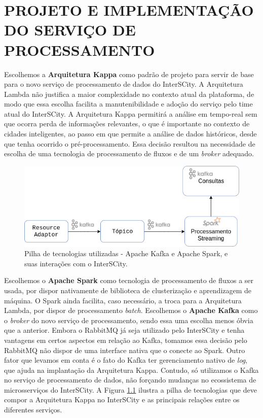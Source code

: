 \chapter[PROJETO E IMPLEMENTAÇÃO DO SERVIÇO DE PROCESSAMENTO]{PROJETO E IMPLEMENTAÇÃO DO SERVIÇO DE PROCESSAMENTO}

\label{chapter:architecture}

Escolhemos a \textbf{Arquitetura Kappa} como padrão de projeto para servir
de base para o novo serviço de processamento de dados do InterSCity.
A Arquitetura Lambda não justifica a maior complexidade no contexto atual da
plataforma, de modo que essa escolha facilita a manutenibilidade e adoção do
serviço pelo time atual do InterSCity. A Arquitetura Kappa permitirá a análise
em tempo-real sem que ocorra perda de informações relevantes, o que é
importante no contexto de cidades inteligentes, ao passo em que permite a
análise de dados históricos, desde que tenha ocorrido o pré-processamento.
Essa decisão resultou na necessidade de escolha de uma tecnologia de
processamento de fluxos e de um \textit{broker} adequado.

\begin{figure}[hbt]
  \centering
    \includegraphics[scale=0.5]{figuras/kappa_tools2.png}
  \caption{Pilha de tecnologias utilizadas - Apache Kafka e Apache Spark, e suas
    interações com o InterSCity.}
  \label{fig:stack}
\end{figure}

Escolhemos o \textbf{Apache Spark} como tecnologia de processamento de fluxos
a ser usada, por dispor nativamente de biblioteca de clusterização
e aprendizagem de máquina. O Spark ainda facilita, caso necessário, a
troca para a Arquitetura Lambda, por dispor de processamento \textit{batch}.
Escolhemos o \textbf{Apache Kafka} como o \textit{broker} do novo serviço de
processamento, sendo essa uma escolha menos óbvia que a anterior. Embora o
RabbitMQ já seja utilizado pelo InterSCity e tenha vantagens em certos aspectos
em relação ao Kafka, tomamos essa decisão pelo RabbitMQ não dispor de uma
interface nativa que o conecte ao Spark. Outro fator que levamos em conta é o
fato do Kafka ter gerenciamento nativo de \textit{log}, que ajuda na
implantação da Arquitetura Kappa. Contudo, só utilizamos o Kafka no serviço
de processamento de dados, não forçando mudanças no ecossistema de
microsserviços do InterSCity. A Figura \ref{fig:stack} ilustra a pilha de
tecnologias que deve compor a Arquitetura Kappa no InterSCity e as principais
relações entre os diferentes serviços.

